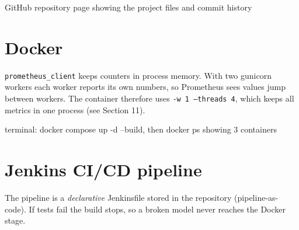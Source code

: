\documentclass[10pt,a4paper]{article}
\let\oldsection\section
\renewcommand{\section}{\Needspace{14\baselineskip}\oldsection}
\begin{document}
\begin{shot}{GitHub repository page showing the project files and commit history}\end{shot}

\section{Docker}

\vspace{-2pt}


\begin{note}
\texttt{prometheus\_client} keeps counters in process memory. With two gunicorn workers each worker reports its own
numbers, so Prometheus sees values jump between workers. The container therefore uses \texttt{-w 1 --threads 4},
which keeps all metrics in one process (see Section 11).
\end{note}

\begin{shot}{terminal: docker compose up -d --build, then docker ps showing 3 containers}\end{shot}

\section{Jenkins CI/CD pipeline}
\begin{center}
\end{center}
The pipeline is a \emph{declarative} Jenkinsfile stored in the repository (pipeline-as-code). If tests fail the build stops, so a broken model never reaches the Docker stage.
\end{document}
